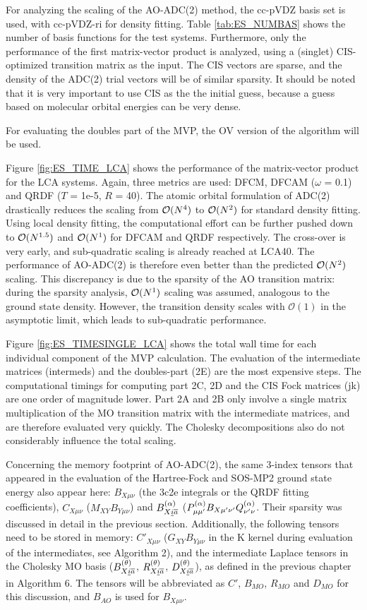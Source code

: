 For analyzing the scaling of the AO-ADC(2) method, the cc-pVDZ basis set is used, with cc-pVDZ-ri for density fitting. Table \ref{tab:ES_NUMBAS} shows the number of basis functions for the test systems. Furthermore, only the performance of the first matrix-vector product is analyzed, using a (singlet) CIS-optimized transition matrix as the input. The CIS vectors are sparse, and the density of the ADC(2) trial vectors will be of similar sparsity. It should be noted that it is very important to use CIS as the the initial guess, because a guess based on molecular orbital energies can be very dense. 

For evaluating the doubles part of the MVP, the OV version of the algorithm will be used.

Figure \ref{fig:ES_TIME_LCA} shows the performance of the matrix-vector product for the LCA systems. Again, three metrics are used: DFCM, DFCAM ($\omega$ = 0.1) and QRDF ($T$ = 1e-5, $R$ = 40). The atomic orbital formulation of ADC(2) drastically reduces the scaling from $\mathcal{O}(N^{4})$ to $\mathcal{O}(N^{2})$ for standard density fitting. Using local density fitting, the computational effort can be further pushed down to $\mathcal{O}(N^{1.5})$ and $\mathcal{O}(N^{1})$ for DFCAM and QRDF respectively. The cross-over is very early, and sub-quadratic scaling is already reached at LCA40. The performance of AO-ADC(2) is therefore even better than the predicted $\mathcal{O}(N^{2})$ scaling. This discrepancy is due to the sparsity of the AO transition matrix: during the sparsity analysis, $\mathcal{O}(N^{1})$ scaling was assumed, analogous to the ground state density. However, the transition density scales with $\mathcal{O}(1)$ in the asymptotic limit, which leads to sub-quadratic performance.

Figure \ref{fig:ES_TIMESINGLE_LCA} shows the total wall time for each individual component of the MVP calculation. The evaluation of the intermediate matrices (intermeds) and the doubles-part (2E) are the most expensive steps. The computational timings for computing part 2C, 2D and the CIS Fock matrices (jk) are one order of magnitude lower. Part 2A and 2B only involve a single matrix multiplication of the MO transition matrix with the intermediate matrices, and are therefore evaluated very quickly. The Cholesky decompositions also do not considerably influence the total scaling. 

Concerning the memory footprint of AO-ADC(2), the same 3-index tensors that appeared in the evaluation of the Hartree-Fock and SOS-MP2 ground state energy also appear here: $B_{X\mu\nu}$ (the 3c2e integrals or the QRDF fitting coefficients), $C_{X\mu\nu}$ ($M_{XY}B_{Y\mu\nu}$) and $B^{(\alpha)}_{X\underline{i}\overline{a}}$ ($P^{(\alpha)}_{\mu\mu'} B_{X\mu'\nu'} Q^{(\alpha)}_{\nu'\nu}$. Their sparsity was discussed in detail in the previous section. Additionally, the following tensors need to be stored in memory: $C'_{X\mu\nu}$ ($G_{XY}B_{Y\mu\nu}$ in the K kernel during evaluation of the intermediates, see Algorithm 2), and the intermediate Laplace tensors in the Cholesky MO basis ($B^{(\theta)}_{X\underline{i}\overline{a}}$, $R^{(\theta)}_{X\underline{i}\overline{a}}$, $D^{(\theta)}_{X\underline{i}\overline{a}}$), as defined in the previous chapter in Algorithm 6. The tensors will be abbreviated as $C'$, $B_{MO}$, $R_{MO}$ and $D_{MO}$ for this discussion, and $B_{AO}$ is used for $B_{X\mu\nu}$.

